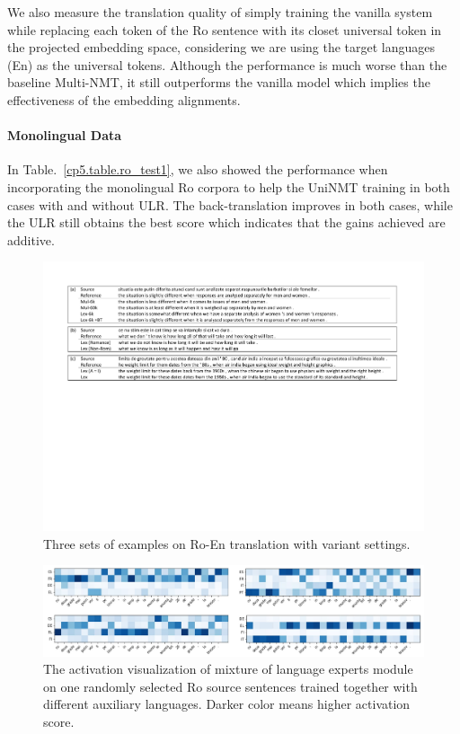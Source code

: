We also measure the translation quality of simply training the vanilla system while replacing each  token of the Ro sentence with its closet universal token in the projected embedding space, considering we are using the target languages (En) as the universal tokens. Although the performance is much worse than the baseline Multi-NMT, it still outperforms the vanilla model which implies the effectiveness of the embedding alignments.

\paragraph{Monolingual Data}
In Table.~\ref{cp5.table.ro_test1},  we also showed the performance when incorporating the monolingual Ro corpora to help the UniNMT training in both cases with and without ULR. The back-translation improves in both cases, while the  ULR  still obtains the best score  which indicates that the gains achieved are additive.

\begin{figure}
\centering
\includegraphics[width=\linewidth]{figs/ulr/examples1}
\caption{\label{cp5.fig.exp}Three sets of examples on Ro-En translation with variant settings. }
\end{figure}
\begin{figure}
\centering
\includegraphics[width=\linewidth]{figs/ulr/vis2}
\caption{\label{cp5.fig.moe} The activation visualization of mixture of language experts module on one randomly selected Ro source sentences trained together with different auxiliary languages. Darker color means higher activation score. }
\end{figure}

